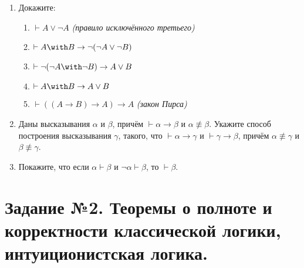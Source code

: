 \documentclass[10pt,a4paper,oneside]{article}
\begin{document}
\begin{enumerate}
\item Докажите:
\begin{enumerate}
\item $\vdash A \vee \neg A$ \emph{(правило исключённого третьего)}
\item $\vdash A \with B \rightarrow \neg (\neg A \vee \neg B)$
\item $\vdash \neg (\neg A \with \neg B) \rightarrow A \vee B$
\item $\vdash A \with B \rightarrow A \vee B$
\item $\vdash ((A \rightarrow B) \rightarrow A)\rightarrow A$ \emph{(закон Пирса)}
\end{enumerate}

\item Даны высказывания $\alpha$ и $\beta$, причём $\vdash \alpha\rightarrow\beta$ и $\alpha\not\equiv\beta$. 
Укажите способ построения высказывания $\gamma$, такого, что
$\vdash\alpha\rightarrow\gamma$ и $\vdash\gamma\rightarrow\beta$, причём $\alpha\not\equiv\gamma$ и
$\beta\not\equiv\gamma$.

\item Покажите, что если $\alpha \vdash \beta$ и $\neg\alpha\vdash\beta$, то $\vdash\beta$.
\end{enumerate}

\section*{Задание №2. Теоремы о полноте и корректности классической логики, интуиционистская логика.}
\end{document}
